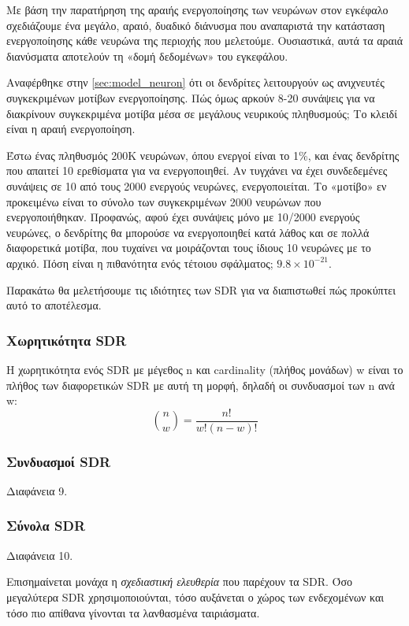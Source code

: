 Με βάση την παρατήρηση της αραιής ενεργοποίησης των νευρώνων στον εγκέφαλο σχεδιάζουμε ένα μεγάλο, αραιό, δυαδικό διάνυσμα που αναπαριστά την κατάσταση ενεργοποίησης κάθε νευρώνα της περιοχής που μελετούμε.
Ουσιαστικά, αυτά τα αραιά διανύσματα αποτελούν τη «δομή δεδομένων» \cite{neuronssynapses,sdrkanerva} του εγκεφάλου.

Αναφέρθηκε στην \ref{sec:model_neuron} ότι οι δενδρίτες λειτουργούν ως ανιχνευτές συγκεκριμένων μοτίβων ενεργοποίησης.
Πώς όμως αρκούν 8-20 συνάψεις για να διακρίνουν συγκεκριμένα μοτίβα μέσα σε μεγάλους νευρικούς πληθυσμούς; Το κλειδί είναι η αραιή ενεργοποίηση.

Έστω ένας πληθυσμός 200K νευρώνων, όπου ενεργοί είναι το 1\%, και ένας δενδρίτης που απαιτεί 10 ερεθίσματα για να ενεργοποιηθεί.
Αν τυγχάνει να έχει συνδεδεμένες συνάψεις σε 10 από τους 2000 ενεργούς νευρώνες, ενεργοποιείται.
Το «μοτίβο» εν προκειμένω είναι το σύνολο των συγκεκριμένων 2000 νευρώνων που ενεργοποιήθηκαν.
Προφανώς, αφού έχει συνάψεις μόνο με 10/2000 ενεργούς νευρώνες, ο δενδρίτης θα μπορούσε να ενεργοποιηθεί κατά λάθος και σε πολλά διαφορετικά μοτίβα,
που τυχαίνει να μοιράζονται τους ίδιους 10 νευρώνες με το αρχικό.
Πόση είναι η πιθανότητα ενός τέτοιου σφάλματος; $9.8\times 10^{-21}$.

Παρακάτω θα μελετήσουμε τις ιδιότητες των SDR για να διαπιστωθεί πώς προκύπτει αυτό το αποτέλεσμα.

\subsubsection{Χωρητικότητα SDR}

Η χωρητικότητα ενός SDR με μέγεθος n και cardinality (πλήθος μονάδων) w είναι το πλήθος των διαφορετικών SDR με αυτή τη μορφή, δηλαδή οι συνδυασμοί των n ανά w: $$ \binom nw= \frac{n!}{w!(n-w)!} $$

\subsubsection{Συνδυασμοί SDR}
Διαφάνεια 9.

\subsubsection{Σύνολα SDR}

Διαφάνεια 10.

Επισημαίνεται μονάχα η \emph{σχεδιαστική ελευθερία} που παρέχουν τα SDR.
Όσο μεγαλύτερα SDR χρησιμοποιούνται, τόσο αυξάνεται ο χώρος των ενδεχομένων και τόσο πιο απίθανα γίνονται τα λανθασμένα ταιριάσματα.


